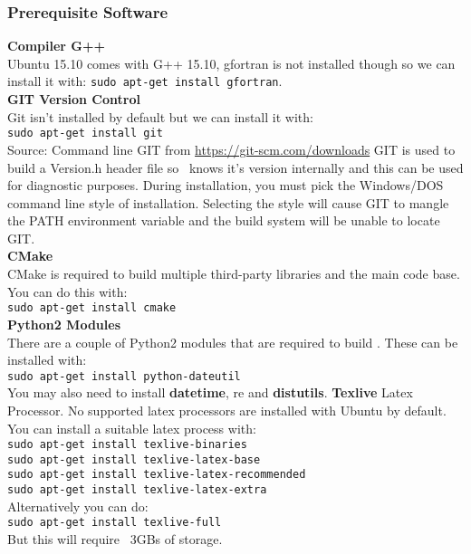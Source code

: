 \subsubsection{Prerequisite Software}
\textbf{Compiler G++}
\\
Ubuntu 15.10 comes with G++ 15.10, gfortran is not installed though so we can install it with: \texttt{sudo apt-get install gfortran}.
\\
\textbf{GIT Version Control}
\\
Git isn’t installed by default but we can install it with:
\\
\texttt{sudo apt-get install git}
\\
Source: Command line GIT from \url{https://git-scm.com/downloads}
GIT is used to build a Version.h header file so \CNAME\ knows it’s version internally and this can be used for diagnostic purposes. During installation, you must pick the Windows/DOS command line style of installation. Selecting the  style will cause GIT to mangle the PATH environment variable and the build system will be unable to locate GIT.
\\
\textbf{CMake}
\\
CMake is required to build multiple third-party libraries and the main code base. You can do this with: 
\\
\texttt{sudo apt-get install cmake}
\\
\textbf{Python2 Modules}
\\
There are a couple of Python2  modules that are required to build \CNAME. These can be installed with:
\\
\texttt{sudo apt-get install python-dateutil}
\\
You may also need to install \textbf{datetime}, re and \textbf{distutils}. \textbf{Texlive} Latex Processor. No supported latex processors are installed with Ubuntu by default. You can install a suitable latex process with:
\\
\texttt{sudo apt-get install texlive-binaries}
\\
\texttt{sudo apt-get install texlive-latex-base}
\\
\texttt{sudo apt-get install texlive-latex-recommended}
\\
\texttt{sudo apt-get install texlive-latex-extra}
\\
Alternatively you can do:
\\
\texttt{sudo apt-get install texlive-full}
\\
But this will require ~3GBs of storage.


